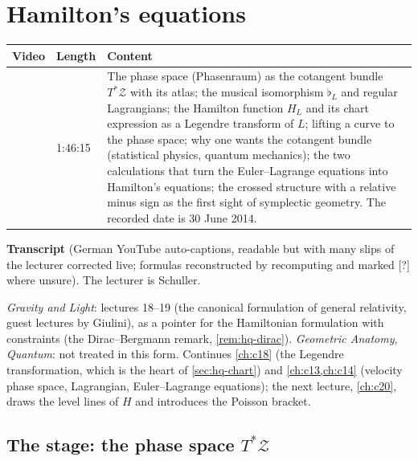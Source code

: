 \chapter{Hamilton's equations}\label{ch:c19}
\begin{paracol}{2}

\begin{sources}
\begin{tabularx}{\linewidth}{@{}l l L@{}}
\toprule
\textbf{Video} & \textbf{Length} & \textbf{Content}\\
\midrule
{} & 1:46:15 & The phase space (Phasenraum) as the cotangent bundle $T^*\mathcal Z$ with its atlas; the musical isomorphism $\flat_L$ and regular Lagrangians; the Hamilton function $H_L$ and its chart expression as a Legendre transform of $L$; lifting a curve to the phase space; why one wants the cotangent bundle (statistical physics, quantum mechanics); the two calculations that turn the Euler--Lagrange equations into Hamilton's equations; the crossed structure with a relative minus sign as the first sight of symplectic geometry. The recorded date is 30 June 2014.\\
\bottomrule
\end{tabularx}

\smallskip
\textbf{Transcript}  (German YouTube auto-captions, readable but with many slips of the lecturer corrected live; formulas reconstructed by recomputing and marked [?] where unsure). The lecturer is Schuller.
\end{sources}

\begin{reading}
\emph{Gravity and Light}: lectures 18--19 (the canonical formulation of general relativity, guest lectures by Giulini), as a pointer for the Hamiltonian formulation with constraints (the Dirac--Bergmann remark, \cref{rem:hq-dirac}). \emph{Geometric Anatomy}, \emph{Quantum}: not treated in this form.
Continues \cref{ch:c18} (the Legendre transformation, which is the heart of \cref{sec:hq-chart}) and \cref{ch:c13,ch:c14} (velocity phase space, Lagrangian, Euler--Lagrange equations); the next lecture, \cref{ch:c20}, draws the level lines of $H$ and introduces the Poisson bracket.
\end{reading}

\section{The stage: the phase space $T^*\mathcal Z$}\label{sec:hq-phase}


\end{paracol}
